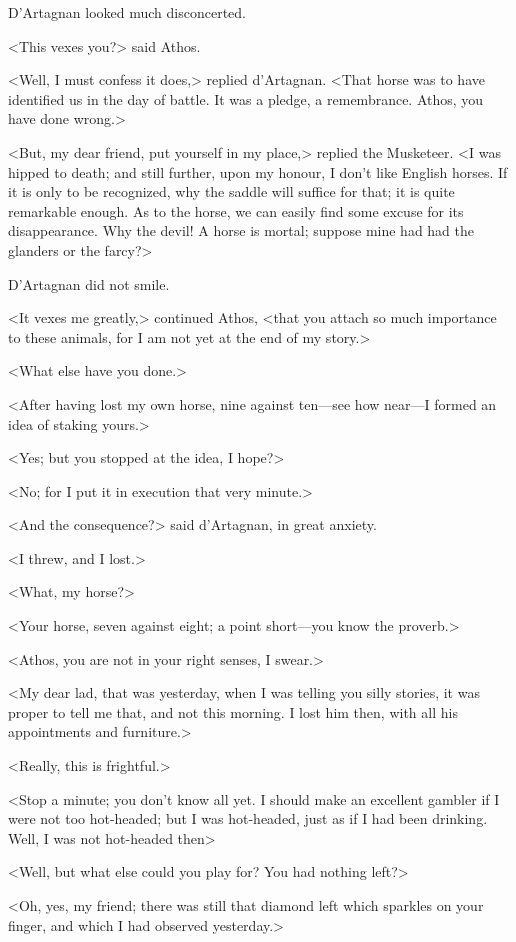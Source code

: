 D'Artagnan looked much disconcerted. 

<This vexes you?> said Athos. 

<Well, I must confess it does,> replied d'Artagnan. <That horse was to have identified us in the day of battle. It was a pledge, a remembrance. Athos, you have done wrong.> 

<But, my dear friend, put yourself in my place,> replied the Musketeer. <I was hipped to death; and still further, upon my honour, I don't like English horses. If it is only to be recognized, why the saddle will suffice for that; it is quite remarkable enough. As to the horse, we can easily find some excuse for its disappearance. Why the devil! A horse is mortal; suppose mine had had the glanders or the farcy?> 

D'Artagnan did not smile. 

<It vexes me greatly,> continued Athos, <that you attach so much importance to these animals, for I am not yet at the end of my story.> 

<What else have you done.> 

<After having lost my own horse, nine against ten---see how near---I formed an idea of staking yours.> 

<Yes; but you stopped at the idea, I hope?> 

<No; for I put it in execution that very minute.> 

<And the consequence?> said d'Artagnan, in great anxiety. 

<I threw, and I lost.> 

<What, my horse?> 

<Your horse, seven against eight; a point short---you know the proverb.> 

<Athos, you are not in your right senses, I swear.> 

<My dear lad, that was yesterday, when I was telling you silly stories, it was proper to tell me that, and not this morning. I lost him then, with all his appointments and furniture.> 

<Really, this is frightful.> 

<Stop a minute; you don't know all yet. I should make an excellent gambler if I were not too hot-headed; but I was hot-headed, just as if I had been drinking. Well, I was not hot-headed then\longdash> 

<Well, but what else could you play for? You had nothing left?> 

<Oh, yes, my friend; there was still that diamond left which sparkles on your finger, and which I had observed yesterday.> 

